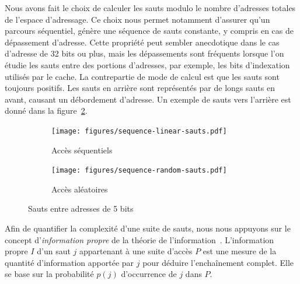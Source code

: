 Nous avons fait le choix de calculer les sauts modulo le nombre d'adresses totales de l'espace d'adressage.
Ce choix nous permet notamment d'assurer qu'un parcours séquentiel, génère une séquence de sauts constante, y compris en cas de dépassement d'adresse.
Cette propriété peut sembler anecdotique dans le cas d'adresse de 32 bits ou plus, mais les dépassements sont fréquents lorsque l'on étudie les sauts entre des portions d'adresses, par exemple, les bits d'indexation utilisés par le cache.
La contrepartie de mode de calcul est que les sauts sont toujours positifs.
Les sauts en arrière sont représentés par de longs sauts en avant, causant un débordement d'adresse.
Un exemple de sauts vers l'arrière est donné dans la figure~\ref{fig:sauts-random}.

\begin{figure}
	\centering
	\begin{subfigure}{0.8\linewidth}
		\texttt{[image: figures/sequence-linear-sauts.pdf]}
		\caption{\label{fig:sauts-linear}Accès séquentiels}
	\end{subfigure}
	\begin{subfigure}{0.8\linewidth}
		\texttt{[image: figures/sequence-random-sauts.pdf]}
		\caption{\label{fig:sauts-random}Accès aléatoires}
	\end{subfigure}
	\caption{\label{fig:sauts} Sauts entre adresses de 5 bits}
\end{figure}

Afin de quantifier la complexité d'une suite de sauts, nous nous appuyons sur le concept d'\emph{information propre} de la théorie de l'information~\cite{shannon1948mathematical}.
L'information propre $I$ d'un saut $j$ appartenant à une suite d'accès $P$ est une mesure de la quantité d'information apportée par $j$ pour déduire l'enchaînement complet.
Elle se base sur la probabilité $p(j)$ d'occurrence de $j$ dans $P$.

